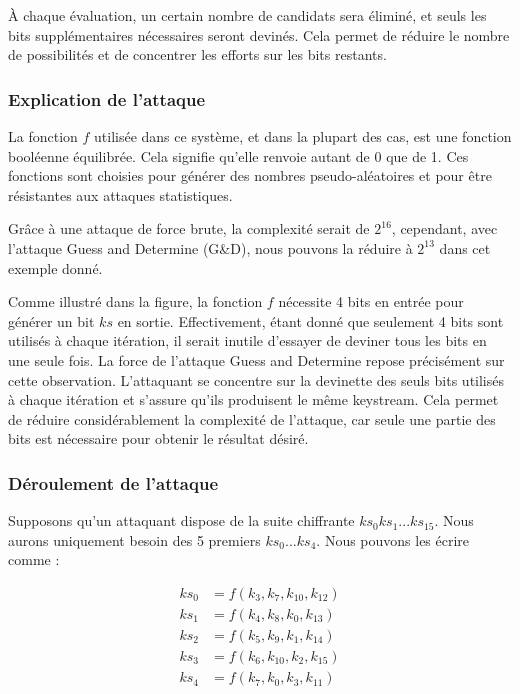 \documentclass{template}
\begin{document}
À chaque évaluation, un certain nombre de candidats sera éliminé, et seuls les bits supplémentaires nécessaires seront devinés. Cela permet de réduire le nombre de possibilités et de concentrer les efforts sur les bits restants.

\subsubsection{Explication de l'attaque}
\baselineskip=16pt
La fonction $f$ utilisée dans ce système, et dans la plupart des cas, est une fonction booléenne équilibrée. Cela signifie qu'elle renvoie autant de 0 que de 1. Ces fonctions sont choisies pour générer des nombres pseudo-aléatoires et pour être résistantes aux attaques statistiques.

Grâce à une attaque de force brute, la complexité serait de $2^{16}$, cependant, avec l'attaque Guess and Determine (G&D), nous pouvons la réduire à $2^{13}$ dans cet exemple donné.

Comme illustré dans la figure, la fonction $f$ nécessite 4 bits en entrée pour générer un bit $ks$ en sortie. Effectivement, étant donné que seulement 4 bits sont utilisés à chaque itération, il serait inutile d'essayer de deviner tous les bits en une seule fois. La force de l'attaque Guess and Determine repose précisément sur cette observation. L'attaquant se concentre sur la devinette des seuls bits utilisés à chaque itération et s'assure qu'ils produisent le même keystream. Cela permet de réduire considérablement la complexité de l'attaque, car seule une partie des bits est nécessaire pour obtenir le résultat désiré.

\subsubsection{Déroulement de l'attaque}
\baselineskip=16pt
Supposons qu'un attaquant dispose de la suite chiffrante $ks_0ks_1...ks_{15}$. Nous aurons uniquement besoin des 5 premiers $ks_0...ks_4$. Nous pouvons les écrire comme :

\begin{align*}
ks_0 &= f(k_3, k_7, k_{10}, k_{12}) \\
ks_1 &= f(k_4, k_8, k_0, k_{13}) \\
ks_2 &= f(k_5, k_9, k_1, k_{14}) \\
ks_3 &= f(k_6, k_{10}, k_2, k_{15}) \\
ks_4 &= f(k_7, k_0, k_3, k_{11})
\end{align*}
\end{document}
